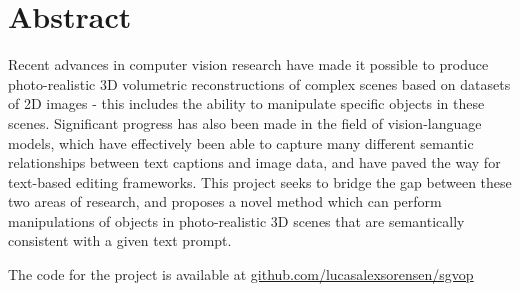 \section*{Abstract}
Recent advances in computer vision research have made it possible to produce photo-realistic 3D volumetric reconstructions of complex scenes based on datasets of 2D images - this includes the ability to manipulate specific objects in these scenes. Significant progress has also been made in the field of vision-language models, which have effectively been able to capture many different semantic relationships between text captions and image data, and have paved the way for text-based editing frameworks. This project seeks to bridge the gap between these two areas of research, and proposes a novel method which can perform manipulations of objects in photo-realistic 3D scenes that are semantically consistent with a given text prompt. 



\vspace{2cm}
The code for the project is available at \url{github.com/lucasalexsorensen/sgvop}
